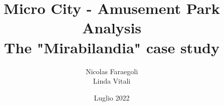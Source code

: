 \title{Micro City - Amusement Park Analysis \\ The "Mirabilandia" case study}
\author{Nicolas Faraegoli\\
Linda Vitali}
\date{Luglio 2022}